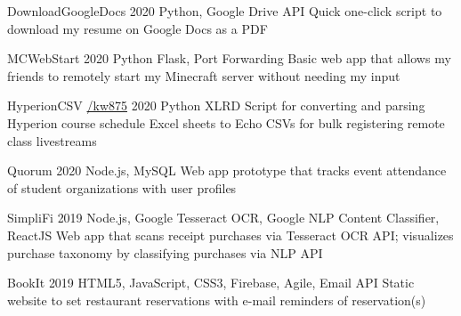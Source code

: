 
\begin{cvprojects}
  \cvproject
  {DownloadGoogleDocs} %
  {\href{https://github.com/KevinIsMyName/DownloadGoogleDocs}{\faGithubSquare\acvHeaderIconSep\@KevinIsMyName}} %
  {2020} %
  {Python, Google Drive API} %
  {Quick one-click script to download my resume on Google Docs as a PDF}

  \cvproject
  {MCWebStart} %
  {\href{https://github.com/KevinIsMyName/MCWebStart}{\faGithubSquare\acvHeaderIconSep\@KevinIsMyName}} %
  {2020} %
  {Python Flask, Port Forwarding} %
  {Basic web app that allows my friends to remotely start my Minecraft server without needing my input}

  \cvproject
  {HyperionCSV}
  {\href{https://github.com/KevinIsMyName/HyperionCSV}{\faGithubSquare\acvHeaderIconSep\@KevinIsMyName/kw875}}
  {2020}
  {Python XLRD}
  {Script for converting and parsing Hyperion course schedule Excel sheets to Echo CSVs for bulk registering remote class livestreams}

  \cvproject
  {Quorum}
  {\href{https://github.com/KevinIsMyName/Quorum}{\faGithubSquare\acvHeaderIconSep\@KevinIsMyName}}
  {2020}
  {Node.js, MySQL}
  {Web app prototype that tracks event attendance of student organizations with user profiles}

  \cvproject
  {SimpliFi}
  {\href{https://github.com/unitehenry/simply-finance}{\faGithubSquare\acvHeaderIconSep{}}}
  {2019}
  {Node.js, Google Tesseract OCR, Google NLP Content Classifier, ReactJS}
  {Web app that scans receipt purchases via Tesseract OCR API; visualizes purchase taxonomy by classifying purchases via NLP API}

  \cvproject
  {BookIt}
  {\href{https://github.com/KevinIsMyName/BookIt}{\faGithubSquare\acvHeaderIconSep{}}}
  {2019}
  {HTML5, JavaScript, CSS3, Firebase, Agile, Email API}
  {Static website to set restaurant reservations with e-mail reminders of reservation(s)}

\end{cvprojects}